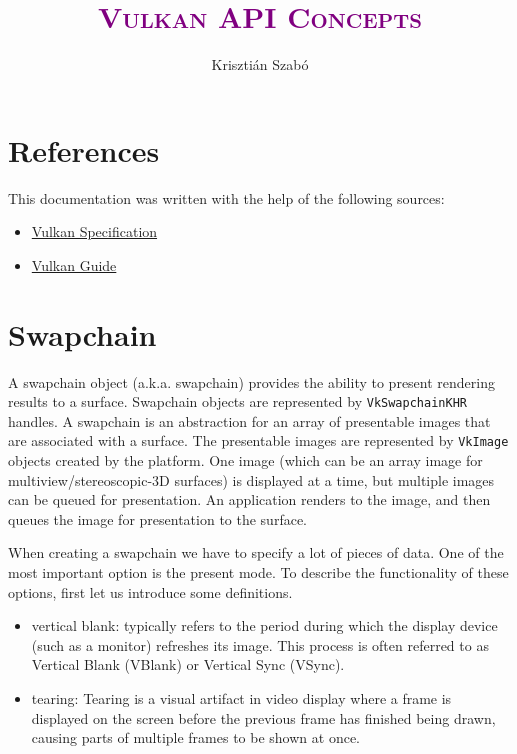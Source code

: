 \documentclass[12pt]{article}
\title{\textcolor{purple}{\Huge\textbf{\textsc{Vulkan API Concepts}}}}
\author{Krisztián Szabó}
\begin{document}
	
	\maketitle
	\tableofcontents
	\newpage
	
	\section{References}
	This documentation was written with the help of the following sources:
	\begin{itemize}
		\item \href{https://docs.vulkan.org/spec/latest/index.html}{Vulkan Specification}
		\item \href{https://vkguide.dev}{Vulkan Guide}
	\end{itemize}
	
	

	\newpage
	\section{Swapchain}
	
	A swapchain object (a.k.a. swapchain) provides the ability to present rendering results to a surface. Swapchain objects are represented by \texttt{VkSwapchainKHR} handles. A swapchain is an abstraction for an array of presentable images that are associated with a surface. The presentable images are represented by \texttt{VkImage} objects created by the platform. One image (which can be an array image for multiview/stereoscopic-3D surfaces) is displayed at a time, but multiple images can be queued for presentation. An application renders to the image, and then queues the image for presentation to the surface.\newline
	
	When creating a swapchain we have to specify a lot of pieces of data. One of the most important option is the present mode. To describe the functionality of these options, first let us introduce some definitions.
	
	\begin{itemize}
		\item vertical blank: typically refers to the period during which the display device (such as a monitor) refreshes its image. This process is often referred to as Vertical Blank (VBlank) or Vertical Sync (VSync).
		\item tearing: Tearing is a visual artifact in video display where a frame is displayed on the screen before the previous frame has finished being drawn, causing parts of multiple frames to be shown at once.
	\end{itemize}
	
\end{document}

